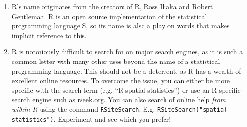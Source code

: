 \documentclass[]{article}
\begin{document}
\begin{enumerate}
\def\labelenumi{\arabic{enumi}.}
\item
  R's name originates from the creators of R, Ross Ihaka and Robert
  Gentleman. R is an open source implementation of the statistical
  programming language S, so its name is also a play on words that makes
  implicit reference to this.
\item
  R is notoriously difficult to search for on major search engines, as
  it is such a common letter with many other uses beyond the name of a
  statistical programming language. This should not be a deterrent, as R
  has a wealth of excellent online resources. To overcome the issue, you
  can either be more specific with the search term (e.g. ``R spatial
  statistics'') or use an R specific search engine such as
  \href{http://www.rseek.org/}{rseek.org}. You can also search of online
  help \emph{from within R} using the command \texttt{RSiteSearch}. E.g.
  \texttt{RSiteSearch("spatial statistics")}. Experiment and see which
  you prefer!
\end{enumerate}
\end{document}
